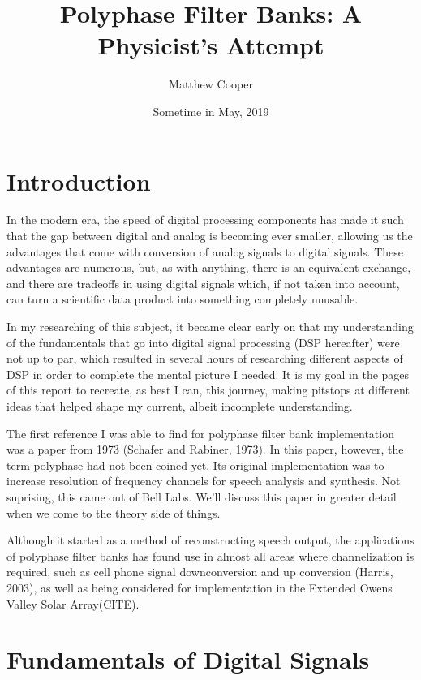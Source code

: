 \documentclass{report}
\title{Polyphase Filter Banks: A Physicist's Attempt}
\author{Matthew Cooper}
\date{Sometime in May, 2019}
\begin{document}
\maketitle

\tableofcontents{}

\newpage
\chapter{Introduction}

In the modern era, the speed of digital processing components has made it such that the gap between digital and analog is becoming ever smaller, allowing us the advantages that come with conversion of analog signals to digital signals.  These advantages are numerous, but, as with anything, there is an equivalent exchange, and there are tradeoffs in using digital signals which, if not taken into account, can turn a scientific data product into something completely unusable.

In my researching of this subject, it became clear early on that my understanding of the fundamentals that go into digital signal processing (DSP hereafter) were not up to par, which resulted in several hours of researching different aspects of DSP in order to complete the mental picture I needed.  It is my goal in the pages of this report to recreate, as best I can, this journey, making pitstops at different ideas that helped shape my current, albeit incomplete understanding.  

The first reference I was able to find for polyphase filter bank implementation was a paper from 1973 (Schafer and Rabiner, 1973).  In this paper, however, the term polyphase had not been coined yet.  Its original implementation was to increase resolution of frequency channels for speech analysis and synthesis.  Not suprising, this came out of Bell Labs.  We'll discuss this paper in greater detail when we come to the theory side of things.

Although it started as a method of reconstructing speech output, the applications of polyphase filter banks has found use in almost all areas where channelization is required, such as cell phone signal downconversion and up conversion (Harris, 2003), as well as being considered for implementation in the Extended Owens Valley Solar Array(CITE).  

\chapter{Fundamentals of Digital Signals}
\end{document}

